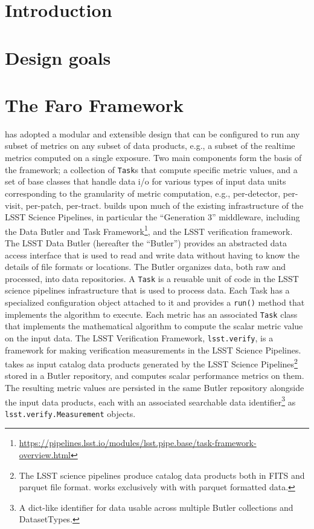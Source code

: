 \section{Introduction} \label{sec:intro}


\section{Design goals} \label{sec:design}


\section{The Faro Framework} \label{sec:faro}

\faro has adopted a modular and extensible design that can be configured  to run any subset of metrics on any subset of data products, e.g., a  subset of the realtime metrics computed on a single exposure. 
Two main components form the basis of the \faro framework;  a collection of \texttt{Task}s that compute specific metric values, and a set of base classes that handle data i/o for various types of input data units corresponding to the granularity of metric computation, e.g., per-detector, per-visit, per-patch, per-tract. 
\faro builds upon much of the existing infrastructure of the LSST Science Pipelines, in particular the ``Generation 3'' middleware, including the Data Butler and Task Framework\footnote{\url{https://pipelines.lsst.io/modules/lsst.pipe.base/task-framework-overview.html}}\cite{dmtn-229}, and the LSST verification framework\cite{SQR-019}. 
The LSST Data Butler (hereafter the ``Butler'') provides an abstracted data access interface that is used to read and write data without having to know the details of file formats or locations.
The Butler organizes data, both raw and processed, into data repositories.
A \texttt{Task} is a reusable unit of code in the LSST science pipelines infrastructure that is used to process data.
Each Task has a specialized configuration object attached to it and provides a \texttt{run()} method that implements the algorithm to execute. 
Each \faro metric has an associated \texttt{Task} class that implements the mathematical algorithm to compute the scalar metric value on the input data.
The LSST Verification Framework, \texttt{lsst.verify}, is a framework for making verification measurements in the LSST Science Pipelines.
\faro takes as input catalog data products generated by the LSST Science Pipelines\footnote{The LSST science pipelines produce catalog data products both in FITS and parquet file format. \faro works exclusively with with parquet formatted data.} stored in a Butler repository, 
 and computes scalar performance metrics on them. 
The resulting metric values
are persisted in the same Butler repository alongside the input data products, each with an associated searchable data identifier\footnote{A dict-like identifier for data usable across multiple Butler collections and DatasetTypes.} as \texttt{lsst.verify.Measurement} objects.


